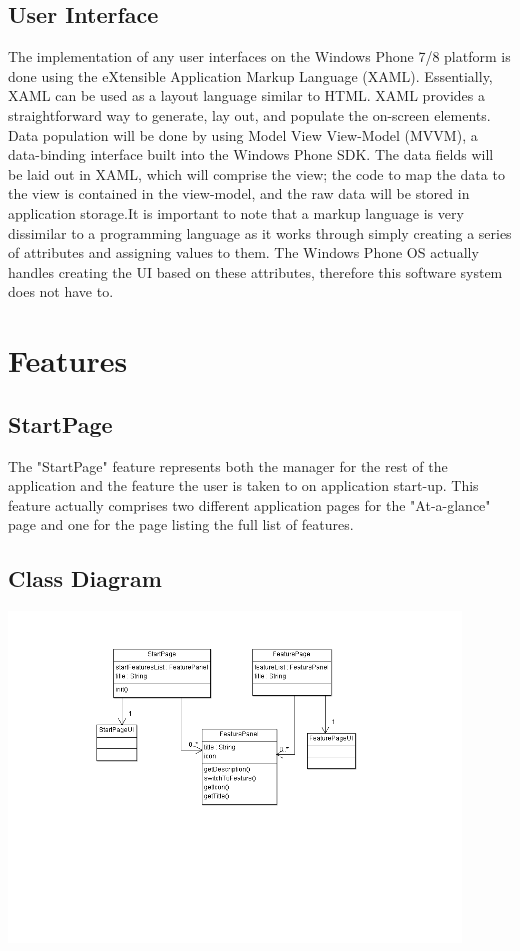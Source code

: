 \documentclass[pdftex,12pt,letter]{article}
\begin{document}
\subsection{User Interface}
The implementation of any user interfaces on the Windows Phone 7/8 platform is done using the eXtensible Application Markup Language (XAML). Essentially, XAML can be used as a layout language similar to HTML. XAML provides a straightforward way to generate, lay out, and populate the on-screen elements. Data population will be done by using Model View View-Model (MVVM), a data-binding interface built into the Windows Phone SDK. The data fields will be laid out in XAML, which will comprise the view; the code to map the data to the view is contained in the view-model, and the raw data will be stored in application storage.It is important to note that a markup language is very dissimilar to a programming language as it works through simply creating a series of attributes and assigning values to them. The Windows Phone OS actually handles creating the UI based on these attributes, therefore this software system does not have to.
\\
\section{Features}
\subsection{StartPage}

The "StartPage" feature represents both the manager for the rest of the application and the feature the user is taken to on application start-up. This feature actually comprises two different application pages for the "At-a-glance" page and one for the page listing the full list of features.

\subsection{Class Diagram}

\includegraphics[width=120mm]{StartPageCD.png}
\end{document}
